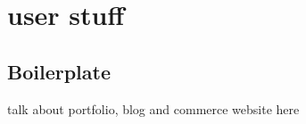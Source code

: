 \newpage
\part{user stuff}
\chapter*{Boilerplate}

talk about portfolio, blog and commerce website here